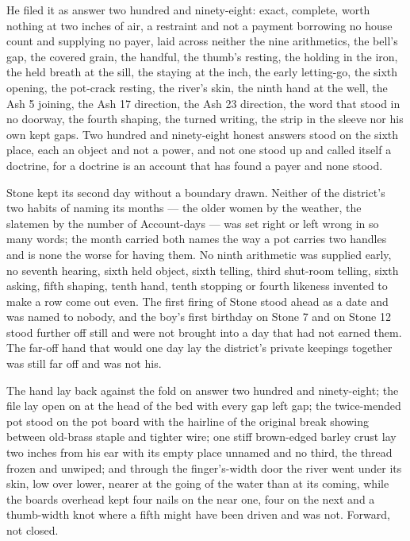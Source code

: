 He filed it as answer two hundred and ninety-eight: exact, complete, worth nothing at two inches of air, a restraint and not a payment borrowing no house count and supplying no payer, laid across neither the nine arithmetics, the bell's gap, the covered grain, the handful, the thumb's resting, the holding in the iron, the held breath at the sill, the staying at the inch, the early letting-go, the sixth opening, the pot-crack resting, the river's skin, the ninth hand at the well, the Ash 5 joining, the Ash 17 direction, the Ash 23 direction, the word that stood in no doorway, the fourth shaping, the turned writing, the strip in the sleeve nor his own kept gaps. Two hundred and ninety-eight honest answers stood on the sixth place, each an object and not a power, and not one stood up and called itself a doctrine, for a doctrine is an account that has found a payer and none stood.

Stone kept its second day without a boundary drawn. Neither of the district's two habits of naming its months --- the older women by the weather, the slatemen by the number of Account-days --- was set right or left wrong in so many words; the month carried both names the way a pot carries two handles and is none the worse for having them. No ninth arithmetic was supplied early, no seventh hearing, sixth held object, sixth telling, third shut-room telling, sixth asking, fifth shaping, tenth hand, tenth stopping or fourth likeness invented to make a row come out even. The first firing of Stone stood ahead as a date and was named to nobody, and the boy's first birthday on Stone 7 and  on Stone 12 stood further off still and were not brought into a day that had not earned them. The far-off hand that would one day lay the district's private keepings together was still far off and was not his.

The hand lay back against the fold on answer two hundred and ninety-eight; the file lay open on  at the head of the bed with every gap left gap; the twice-mended pot stood on the pot board with the hairline of the original break showing between old-brass staple and tighter wire; one stiff brown-edged barley crust lay two inches from his ear with its empty place unnamed and no third, the thread frozen and unwiped; and through the finger's-width door the river went under its skin, low over lower, nearer at the going of the water than at its coming, while the boards overhead kept four nails on the near one, four on the next and a thumb-width knot where a fifth might have been driven and was not. Forward, not closed.
